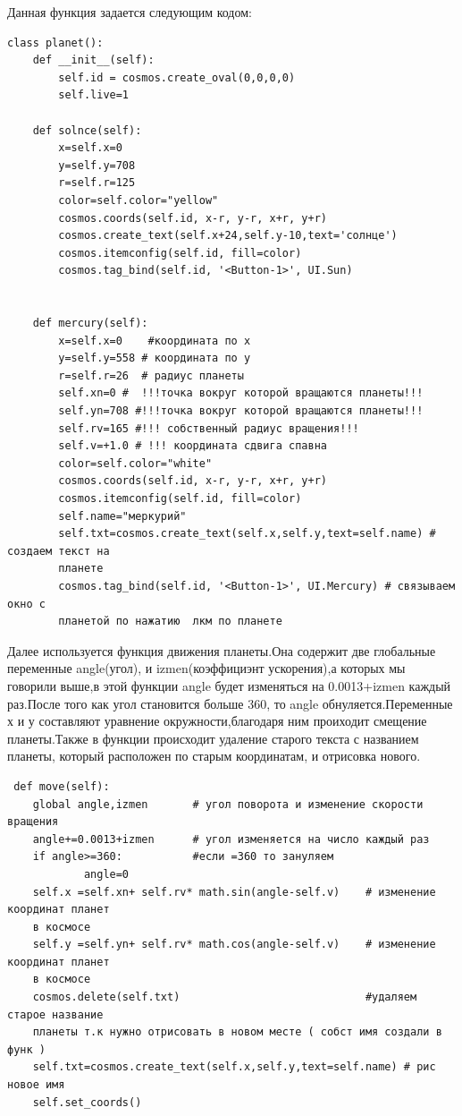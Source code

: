 \documentclass[11pt,a4paper]{report}
\begin{document}
Данная функция задается следующим кодом:
\begin{verbatim}
class planet():
    def __init__(self):
        self.id = cosmos.create_oval(0,0,0,0)
        self.live=1
        
    def solnce(self):
        x=self.x=0
        y=self.y=708
        r=self.r=125
        color=self.color="yellow"
        cosmos.coords(self.id, x-r, y-r, x+r, y+r)
        cosmos.create_text(self.x+24,self.y-10,text='солнце')
        cosmos.itemconfig(self.id, fill=color)
        cosmos.tag_bind(self.id, '<Button-1>', UI.Sun)
      
        
    def mercury(self):
        x=self.x=0    #координата по х
        y=self.y=558 # координата по у
        r=self.r=26  # радиус планеты
        self.xn=0 #  !!!точка вокруг которой вращаются планеты!!!
        self.yn=708 #!!!точка вокруг которой вращаются планеты!!!
        self.rv=165 #!!! собственный радиус вращения!!!
        self.v=+1.0 # !!! координата сдвига спавна 
        color=self.color="white"
        cosmos.coords(self.id, x-r, y-r, x+r, y+r)
        cosmos.itemconfig(self.id, fill=color) 
        self.name="меркурий"
        self.txt=cosmos.create_text(self.x,self.y,text=self.name) # создаем текст на 
        планете
        cosmos.tag_bind(self.id, '<Button-1>', UI.Mercury) # связываем окно с 
        планетой по нажатию  лкм по планете
\end{verbatim}
Далее используется функция движения планеты.Она содержит две глобальные переменные angle(угол), и izmen(коэффициэнт ускорения),а которых мы говорили выше,в этой функции angle будет изменяться на 0.0013+izmen каждый раз.После того как угол становится больше 360, то angle обнуляется.Переменные х и у составляют уравнение окружности,благодаря ним проиходит смещение планеты.Также в функции происходит удаление старого текста с названием планеты, который расположен по старым координатам, и отрисовка нового.

\begin{verbatim}
 def move(self):
    global angle,izmen       # угол поворота и изменение скорости вращения 
    angle+=0.0013+izmen      # угол изменяется на число каждый раз
    if angle>=360:           #если =360 то зануляем
            angle=0
    self.x =self.xn+ self.rv* math.sin(angle-self.v)    # изменение координат планет 
    в космосе 
    self.y =self.yn+ self.rv* math.cos(angle-self.v)    # изменение координат планет 
    в космосе
    cosmos.delete(self.txt)                             #удаляем старое название 
    планеты т.к нужно отрисовать в новом месте ( собст имя создали в функ )
    self.txt=cosmos.create_text(self.x,self.y,text=self.name) # рис новое имя
    self.set_coords()   
\end{verbatim}
\end{document}

